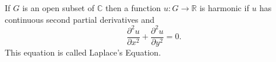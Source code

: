 If $G$ is an open subset of $\mathbb{C}$ then a function $u: G \to \mathbb{R}$ is harmonic if $u$ has continuous second partial derivatives and
$$\frac{\partial^2 u}{\partial x^2} + \frac{\partial^2 u}{\partial y^2} = 0.$$
This equation is called Laplace's Equation.
